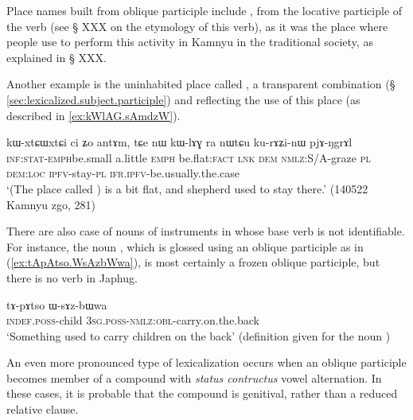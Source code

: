 Place names built from oblique participle include , from the locative participle  of the verb  (see § XXX on the etymology of this verb), as it was the place where people use to perform this activity in Kamnyu in the traditional society, as explained in § XXX.

Another example is the uninhabited place called , a transparent combination   (§ \ref{sec:lexicalized.subject.participle}) and  reflecting the use of this place (as described in \ref{ex:kWlAG.sAmdzW}).

\begin{exe}
\ex \label{ex:kWlAG.sAmdzW}
\gll    kɯ-xtɕɯ\redp{}xtɕi ci ʑo antɤm, tɕe nɯ kɯ-lɤɣ ra nɯtɕu ku-rɤʑi-nɯ pjɤ-ŋgrɤl \\
\textsc{inf}:\textsc{stat}-\textsc{emph}\redp{}be.small a.little \textsc{emph} be.flat:\textsc{fact}  \textsc{lnk} \textsc{dem} \textsc{nmlz}:S/A-graze \textsc{pl} \textsc{dem}:\textsc{loc} \textsc{ipfv}-stay-\textsc{pl} \textsc{ifr}.\textsc{ipfv}-be.usually.the.case \\
\glt `(The place called ) is a bit flat, and shepherd used to stay there.' (140522 Kamnyu zgo, 281)
 \end{exe}
 
There are also case of nouns of instruments in  whose base verb is not identifiable. For instance, the noun , which is glossed using an oblique participle as in (\ref{ex:tApAtso.WsAzbWwa}), is most certainly a frozen oblique participle, but there is no verb  in Japhug.

\begin{exe}
\ex \label{ex:tApAtso.WsAzbWwa}
\gll   tɤ-pɤtso ɯ-sɤz-bɯwa \\
\textsc{indef}.\textsc{poss}-child \textsc{3sg}.\textsc{poss}-\textsc{nmlz}:\textsc{obl}-carry.on.the.back \\
\glt `Something used to carry children on the back' (definition given for the noun )
\end{exe}

An even more pronounced type of lexicalization occurs when an oblique participle becomes member of a compound with \textit{status contructus} vowel alternation. In these cases, it is probable that the compound is genitival, rather than a reduced relative clause.

